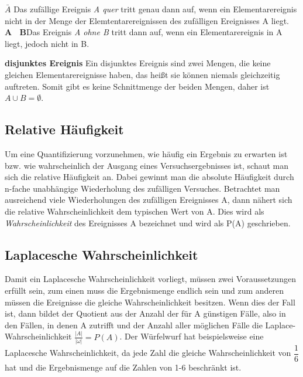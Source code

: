 \documentclass[a4paper]{article}
\begin{document}
\textbf{$\bar A$} Das zufällige Ereignis \textit{A quer} tritt genau dann auf, wenn ein Elementarereignis nicht in der Menge der Elemtentarereignissen des zufälligen Ereignisses A liegt.\\

\textbf{A \ B}Das Ereignis \textit{A ohne B} tritt dann auf, wenn ein Elementarereignis in A liegt, jedoch nicht in B.

\textbf{disjunktes Ereignis} Ein disjunktes Ereignis sind zwei Mengen, die keine gleichen Elementarereignisse haben, das heißt sie können niemals gleichzeitig auftreten. Somit gibt es keine Schnittmenge der beiden Mengen, daher ist $A\cup B=\emptyset$.


\subsection{Relative Häufigkeit}
Um eine Quantifizierung vorzunehmen, wie häufig ein Ergebnis zu erwarten ist bzw. wie wahrscheinlich der Ausgang eines Versuchsergebnisses ist, schaut man sich die relative Häufigkeit an. Dabei gewinnt man die absolute Häufigkeit durch n-fache unabhängige Wiederholung des zufälligen Versuches.
Betrachtet man ausreichend viele Wiederholungen des zufälligen Ereignisses A, dann nähert sich die relative Wahrscheinlichkeit dem typischen Wert von A. Dies wird als \textit{Wahrscheinlichkeit} des Ereignisses A bezeichnet und wird als P(A) geschrieben.

\subsection{Laplacesche Wahrscheinlichkeit}
Damit ein Laplacesche Wahrscheinlichkeit vorliegt, müssen zwei Voraussetzungen erfüllt sein, zum einen muss die Ergebnismenge endlich sein und zum anderen müssen die Ereignisse die gleiche Wahrscheinlichkeit besitzen. Wenn dies der Fall ist, dann bildet der Quotient aus der Anzahl der für A günstigen Fälle, also in den Fällen, in denen A zutrifft und der Anzahl aller möglichen Fälle die Laplace-Wahrscheinlichkeit $\frac{|A|}{|\omega|}=P(A)$.
Der Würfelwurf hat beispielsweise eine Laplacesche Wahrscheinlichkeit, da jede Zahl die gleiche Wahrscheinlichkeit von $\dfrac{1}{6}$ hat und die Ergebnismenge auf die Zahlen von 1-6 beschränkt ist.
\end{document}
